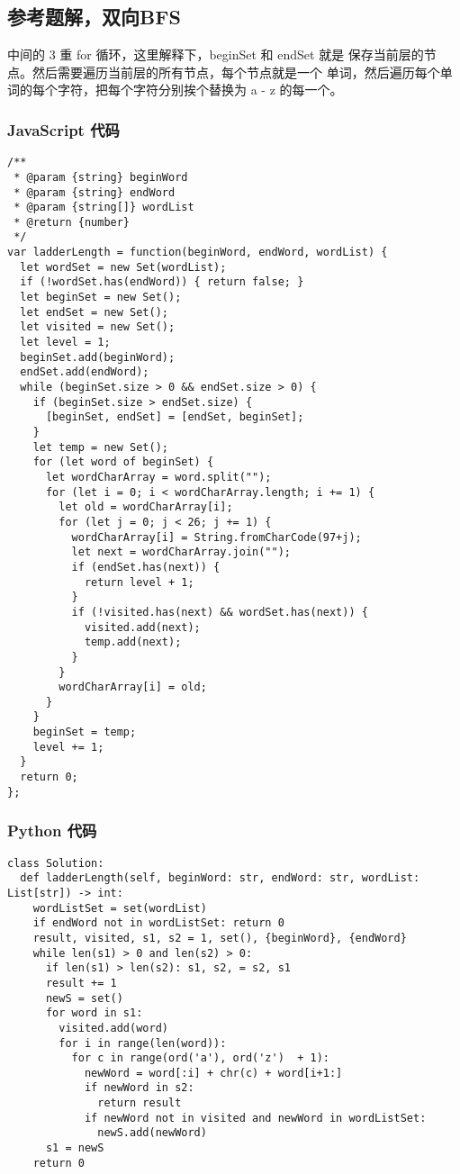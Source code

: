 \subsection{参考题解，双向BFS}

中间的 3 重 for 循环，这里解释下，beginSet 和 endSet 就是
保存当前层的节点。然后需要遍历当前层的所有节点，每个节点就是一个
单词，然后遍历每个单词的每个字符，把每个字符分别挨个替换为 a - z
的每一个。

\subsubsection{JavaScript 代码}

\begin{verbatim}
/**
 * @param {string} beginWord
 * @param {string} endWord
 * @param {string[]} wordList
 * @return {number}
 */
var ladderLength = function(beginWord, endWord, wordList) {
  let wordSet = new Set(wordList);
  if (!wordSet.has(endWord)) { return false; }
  let beginSet = new Set();
  let endSet = new Set();
  let visited = new Set();
  let level = 1;
  beginSet.add(beginWord);
  endSet.add(endWord);
  while (beginSet.size > 0 && endSet.size > 0) {
    if (beginSet.size > endSet.size) {
      [beginSet, endSet] = [endSet, beginSet];
    }
    let temp = new Set();
    for (let word of beginSet) {
      let wordCharArray = word.split("");
      for (let i = 0; i < wordCharArray.length; i += 1) {
        let old = wordCharArray[i];
        for (let j = 0; j < 26; j += 1) {
          wordCharArray[i] = String.fromCharCode(97+j);
          let next = wordCharArray.join("");
          if (endSet.has(next)) {
            return level + 1;
          }
          if (!visited.has(next) && wordSet.has(next)) {
            visited.add(next);
            temp.add(next);
          }
        }
        wordCharArray[i] = old;
      }
    }
    beginSet = temp;
    level += 1;
  }
  return 0;
};
\end{verbatim}

\subsubsection{Python 代码}

\begin{verbatim}
class Solution:
  def ladderLength(self, beginWord: str, endWord: str, wordList: List[str]) -> int:
    wordListSet = set(wordList)
    if endWord not in wordListSet: return 0
    result, visited, s1, s2 = 1, set(), {beginWord}, {endWord}
    while len(s1) > 0 and len(s2) > 0:
      if len(s1) > len(s2): s1, s2, = s2, s1
      result += 1
      newS = set()
      for word in s1:
        visited.add(word)
        for i in range(len(word)):
          for c in range(ord('a'), ord('z')  + 1):
            newWord = word[:i] + chr(c) + word[i+1:]
            if newWord in s2:
              return result
            if newWord not in visited and newWord in wordListSet:
              newS.add(newWord)
      s1 = newS
    return 0
\end{verbatim}
